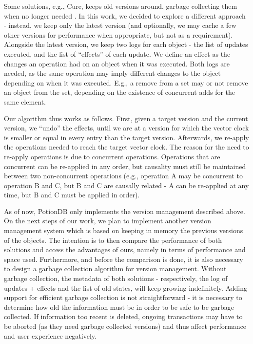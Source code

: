 Some solutions, e.g., Cure, keeps old versions around, garbage collecting them when no longer needed \cite{cure}.
In this work, we decided to explore a different approach - instead, we keep only the latest version (and optionally, we may cache a few other versions for performance when appropriate, but not as a requirement).
Alongside the latest version, we keep two logs for each object - the list of updates executed, and the list of ``effects'' of each update.
We define an effect as the changes an operation had on an object when it was executed.
Both logs are needed, as the same operation may imply different changes to the object depending on when it was executed.
E.g., a remove from a set may or not remove an object from the set, depending on the existence of concurrent adds for the same element.

Our algorithm thus works as follows.
First, given a target version and the current version, we ``undo'' the effects, until we are at a version for which the vector clock is smaller or equal in every entry than the target version.
Afterwards, we re-apply the operations needed to reach the target vector clock.
The reason for the need to re-apply operations is due to concurrent operations.
Operations that are concurrent can be re-applied in any order, but causality must still be maintained between two non-concurrent operations (e.g., operation A may be concurrent to operation B and C, but B and C are causally related - A can be re-applied at any time, but B and C must be applied in order).


As of now, PotionDB only implements the version management described above.
On the next steps of our work, we plan to implement another version management system which is based on keeping in memory the previous versions of the objects.
The intention is to then compare the performance of both solutions and access the advantages of ours, namely in terms of performance and space used.
Furthermore, and before the comparison is done, it is also necessary to design a garbage collection algorithm for version management.
Without garbage collection, the metadata of both solutions - respectively, the log of updates + effects and the list of old states, will keep growing indefinitely.
Adding support for efficient garbage collection is not straightforward - it is necessary to determine how old the information must be in order to be safe to be garbage collected.
If information too recent is deleted, ongoing transactions may have to be aborted (as they need garbage collected versions) and thus affect performance and user experience negatively.

